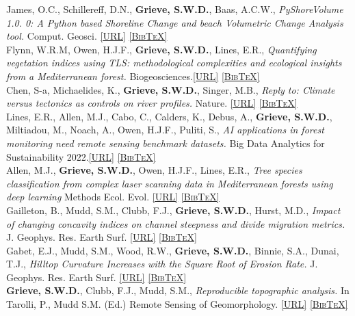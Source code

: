 \documentclass[10pt, a4paper]{article}
\newcommand{\doi}[1]{\href{https://dx.doi.org/#1}{\scriptsize\textsc{[URL]}}}
\newcommand{\bib}[1]{\href{https://www.doi2bib.org/bib/#1}{\scriptsize\textsc{[BibTeX]}}}
\newcommand{\paperlinks}[1]{\doi{#1} \bib{#1}}
\newcommand{\student}{\textbf{\textsuperscript{\textdagger}}}
\newcommand{\years}[1]{\marginnote{\scriptsize #1}}
\begin{document}
\years{2024}James, O.C.\student, Schillereff, D.N., \textbf{Grieve, S.W.D.}, Baas, A.C.W., \textit{PyShoreVolume 1.0. 0: A Python based Shoreline Change and beach Volumetric Change Analysis tool.} Comput. Geosci. \paperlinks{10.1016/j.cageo.2024.105591} \\[0.05cm]

\years{2023}Flynn, W.R.M\student, Owen, H.J.F., \textbf{Grieve, S.W.D.}, Lines, E.R., \textit{Quantifying vegetation indices using TLS: methodological complexities and ecological insights from a Mediterranean forest.} Biogeosciences.\paperlinks{10.5194/bg-20-2769-2023} \\[0.05cm]

\years{2022}Chen, S-a, Michaelides, K., \textbf{Grieve, S.W.D.}, Singer, M.B., \textit{Reply to: Climate versus tectonics as controls on river profiles.} Nature. \paperlinks{10.1038/s41586-022-05419-0}\\[0.05cm]

\years{2022}Lines, E.R., Allen, M.J.\student, Cabo, C., Calders, K., Debus, A., \textbf{Grieve, S.W.D.}, Miltiadou, M., Noach, A., Owen, H.J.F., Puliti, S., \textit{AI applications in forest monitoring need remote sensing benchmark datasets.} Big Data Analytics for Sustainability 2022.\paperlinks{10.48550/arXiv.2212.09937}\\[0.5cm]

\years{2022}Allen, M.J.\student, \textbf{Grieve, S.W.D.}, Owen, H.J.F., Lines, E.R., \textit{Tree species classification from complex laser scanning data in Mediterranean forests using deep learning} Methods Ecol. Evol. \paperlinks{10.1111/2041-210X.13981}\\[0.05cm]

\years{2021}Gailleton, B., Mudd, S.M., Clubb, F.J., \textbf{Grieve, S.W.D.}, Hurst, M.D., \textit{Impact of changing concavity indices on channel steepness and divide migration metrics.} J. Geophys. Res. Earth Surf. \paperlinks{10.1029/2020JF006060}\\[0.05cm]

\years{2021}Gabet, E.J., Mudd, S.M., Wood, R.W., \textbf{Grieve, S.W.D.}, Binnie, S.A., Dunai, T.J., \textit{Hilltop Curvature Increases with the Square Root of Erosion Rate.} J. Geophys. Res. Earth Surf. \paperlinks{10.1029/2020JF005858}\\[0.05cm]

\years{2020} \textbf{Grieve, S.W.D.}, Clubb, F.J., Mudd, S.M., \textit{Reproducible topographic analysis.} In Tarolli, P., Mudd S.M. (Ed.) Remote Sensing of Geomorphology. \paperlinks{10.1016/B978-0-444-64177-9.00012-6}\\[0.05cm]
\end{document}
